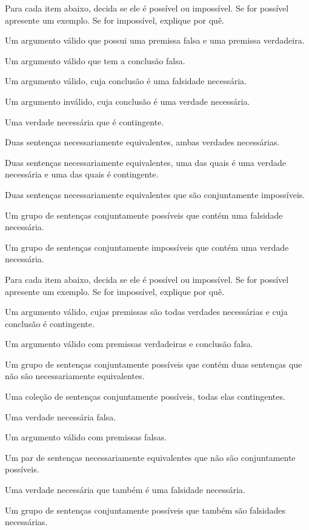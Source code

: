 \problempart
\label{pr.EnglishCombinations2}
Para cada item abaixo, decida se ele é possível ou impossível.
Se for possível apresente um exemplo.
Se for impossível, explique por quê.
\begin{earg}
\item Um argumento válido que possui uma premissa falsa e uma premissa verdadeira.

\item Um argumento válido que tem a conclusão falsa.

\item Um argumento válido, cuja conclusão é uma falsidade necessária.

\item Um argumento inválido, cuja conclusão é uma verdade necessária.

\item Uma verdade necessária que é contingente.

\item Duas sentenças necessariamente equivalentes, ambas verdades necessárias.

\item Duas sentenças necessariamente equivalentes, uma das quais é uma verdade necessária e uma das quais é contingente.

\item Duas sentenças necessariamente equivalentes que são conjuntamente impossíveis.

\item Um grupo de sentenças conjuntamente possíveis que contém uma falsidade necessária.

\item Um grupo de sentenças conjuntamente impossíveis que contém uma verdade necessária.
\end{earg}


\problempart
Para cada item abaixo, decida se ele é possível ou impossível.
Se for possível apresente um exemplo.
Se for impossível, explique por quê.
\begin{earg}
\item Um argumento válido, cujas premissas são todas verdades necessárias e cuja conclusão é contingente.
\item Um argumento válido com premissas verdadeiras e conclusão falsa.
\item Um grupo de sentenças conjuntamente possíveis que contém duas sentenças que não são necessariamente equivalentes.
\item Uma coleção de sentenças conjuntamente possíveis, todas elas contingentes.
\item Uma verdade necessária falsa.
\item Um argumento válido com premissas falsas.
\item Um par de sentenças necessariamente equivalentes que não são conjuntamente possíveis.
\item Uma verdade necessária que também é uma falsidade necessária.
\item Um grupo de sentenças conjuntamente possíveis que também são falsidades necessárias.
\end{earg}

